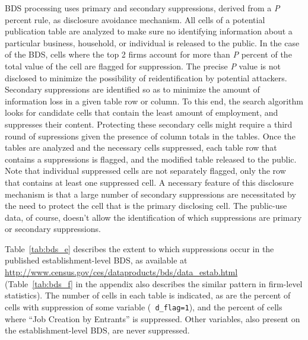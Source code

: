 
BDS processing uses primary and secondary suppressions, derived from a \emph{P} percent rule, as disclosure avoidance mechanism. All cells of a potential publication table are analyzed to make sure no identifying information about a particular business, household, or individual  is released to the public. In the case of the BDS, cells where the top 2 firms account for more than \emph{P} percent of the total value of the cell are flagged for suppression. The precise \emph{P} value is not disclosed to minimize the possibility of reidentification by potential attackers. Secondary suppressions are identified so as to minimize the amount of information loss in a given table row or column. To this end, the search algorithm looks for candidate cells that contain the least amount of employment, and suppresses their content. Protecting these secondary cells might require a third round of supressions given the presence of column totals in the tables.
Once the tables are analyzed and the necessary cells suppressed, each table row that contains a suppressions is flagged, and the modified table released to the public. Note that individual suppressed cells are not separately flagged, only the row that contains at least one suppressed cell.  A necessary feature of this disclosure mechanism is that a large number of  secondary suppressions  are necessitated by the need to protect the cell that is the primary disclosing cell. The public-use data, of course, doesn't allow the identification of which suppressions are primary or secondary suppressions.


Table~\ref{tab:bds_e} describes the extent to which suppressions occur in the  published 
establishment-level \ac{BDS}, as available at 
\url{http://www.census.gov/ces/dataproducts/bds/data_estab.html} (Table~\ref{tab:bds_f} in 
the appendix also describes the similar pattern in firm-level statistics). The number of cells in 
each table is indicated, as are the percent of cells with  suppression of some variable ({\tt 
d\_flag=1}),  and the percent of cells where ``Job Creation by Entrants'' is suppressed. Other 
variables, also present on the establishment-level \ac{BDS}, are never suppressed. 


